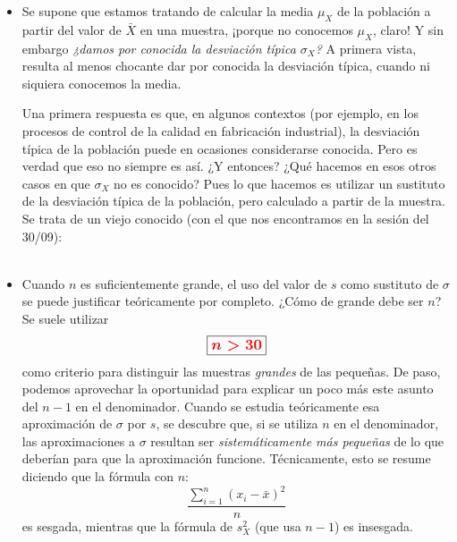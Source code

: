        \begin{itemize}

       \item Se supone que estamos tratando de calcular la media $\mu_X$ de la población a partir del valor de $\bar X$ en una muestra, ¡porque no conocemos $\mu_X$, claro! Y sin embargo {\em ¿damos por conocida la desviación típica $\sigma_X$?} A primera vista, resulta al menos chocante dar por conocida la desviación típica, cuando ni siquiera conocemos la media.

           Una primera respuesta es que, en algunos contextos (por ejemplo, en los procesos de control de la calidad en fabricación industrial), la desviación típica de la población puede en ocasiones considerarse conocida. Pero es verdad que eso no siempre es así. ¿Y entonces? ¿Qué hacemos en esos otros casos en que $\sigma_X$ no es conocido? Pues lo que hacemos es utilizar un sustituto de la desviación típica de la población, pero calculado a partir de la muestra. Se trata de un viejo conocido (con el que nos encontramos en la sesión del 30/09):\\[3mm]
           \\[3mm]

       \item Cuando $n$ es suficientemente grande, el uso del valor de $s$ como sustituto de $\sigma$ se puede justificar teóricamente por completo. ¿Cómo de grande debe ser $n$? Se suele utilizar
            \[\fbox{\textcolor{red}{\boldmath\large $n>30$}}\]
           como criterio para distinguir las muestras {\em grandes} de las pequeñas. De paso, podemos aprovechar la oportunidad para explicar un poco más este asunto del $n-1$ en el denominador. Cuando se estudia teóricamente esa aproximación de $\sigma$ por $s$, se descubre que, si se utiliza $n$ en el denominador, las aproximaciones a $\sigma$ resultan ser {\em sistemáticamente más pequeñas} de lo que deberían para que la aproximación funcione. Técnicamente, esto se resume diciendo que la fórmula con $n$:
           \[\dfrac{\displaystyle\sum_{i=1}^n(x_i-\bar x)^2}{{n}}\]
           es {\sf sesgada}, mientras que la fórmula de $s^2_X$ (que usa $n-1$) es {\sf insesgada}.


\end{itemize}
